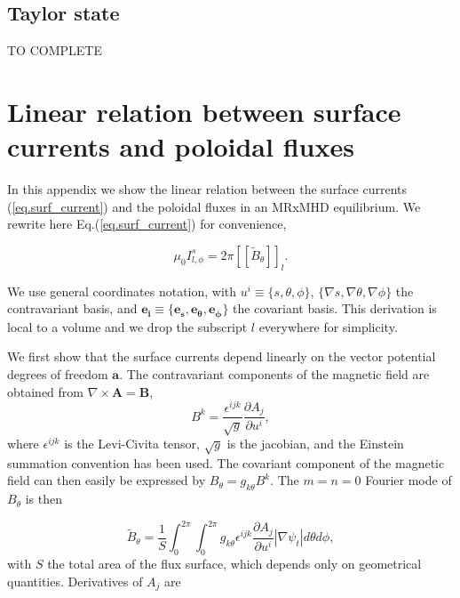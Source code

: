\section{Taylor state}
\label{appendix taylor state}
{\color{red} TO COMPLETE}


\chapter{Linear relation between surface currents and poloidal fluxes}\label{appA1}

In this appendix we show the linear relation between the surface currents (\ref{eq.surf_current}) and the poloidal fluxes in an \ac{MRxMHD} equilibrium. We rewrite here Eq.(\ref{eq.surf_current}) for convenience,

\begin{equation}
	\mu_0I^s_{l,\phi} = 2\pi\left[\left[\tilde{B}_\theta\right]\right]_l.
\end{equation}

We use general coordinates notation, with $u^i\equiv\{s,\theta,\phi\}$, $\{\nabla s,\nabla\theta,\nabla\phi\}$ the contravariant basis, and $\mathbf{e_i}\equiv\{\mathbf{e_s},\mathbf{e_\theta},\mathbf{e_\phi}\}$ the covariant basis. This derivation is local to a volume and we drop the subscript $l$ everywhere for simplicity.

We first show that the surface currents depend linearly on the vector potential degrees of freedom $\mathbf{a}$. The contravariant components of the magnetic field are obtained from $\nabla\times\mathbf{A}=\mathbf{B}$,
\begin{equation}
	B^k = \frac{\epsilon^{ijk}}{\sqrt{g}}\frac{\partial A_j}{\partial u^i},
\end{equation}
where  $\epsilon^{ijk}$ is the Levi-Civita tensor, $\sqrt{g}$ is the jacobian, and the Einstein summation convention has been used. The covariant component of the magnetic field can then easily be expressed by $B_\theta = g_{k\theta}B^k$. The $m=n=0$ Fourier mode of $B_\theta$ is then

\begin{equation}
	\tilde{B}_\theta = \frac{1}{S}\int_0^{2\pi}\int_0^{2\pi} g_{k\theta}\epsilon^{ijk}\frac{\partial A_j}{\partial u^i}|\nabla\psi_t| d\theta d\phi, \label{eq.AppA1.1}
\end{equation}
with $S$ the total area of the flux surface, which depends only on geometrical quantities. Derivatives of $A_j$ are

